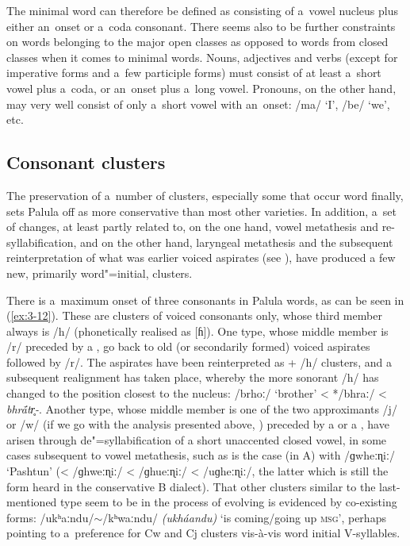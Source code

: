 The minimal word can therefore be defined as consisting of a~vowel nucleus plus either an~onset or a~coda consonant. There seems also to be further constraints on words belonging to the major open classes as opposed to words from closed classes when it comes to minimal words. Nouns, adjectives and verbs (except for imperative forms and a~few participle forms) must consist of at least a~short vowel plus a~coda, or an~onset plus a~long vowel. Pronouns, on the other hand, may very well consist of only a~short vowel with an~onset: /ma/ `I', /be/ `we', etc.


\subsection{Consonant clusters}
\label{subsec:3-3-2}


The preservation of a~number of clusters, especially some that occur word finally, sets Palula off as more conservative than most other \iliShina varieties. In addition, a~set of changes, at least partly related to, on the one hand, vowel metathesis and re-syllabification, and on the other hand, laryngeal metathesis and the subsequent reinterpretation of what was earlier voiced aspirates (see ), have produced a few new, primarily word"=initial, clusters.


There is a~maximum onset of three consonants in Palula words, as can be seen in (\ref{ex:3-12}). These are clusters of voiced consonants only, whose third member always is /h/ (phonetically realised as [ɦ]).  One type, whose middle member is /r/ preceded by a , go back to old (or secondarily formed) voiced aspirates followed by /r/. The aspirates have been reinterpreted as  + /h/ clusters, and a subsequent realignment has taken place, whereby the more sonorant /h/ has changed to the position closest to the  nucleus: /brhoː/ `brother' < */bhraː/ < \textit{bhr\'{\={a}}tr̥-}. Another type, whose middle member is one of the two approximants /j/ or /w/ (if we go with the analysis presented above, ) preceded by a  or a , have arisen through de"=syllabification of a short unaccented closed vowel, in some cases subsequent to vowel metathesis, such as is the case (in A) with /ɡwheːɳiː/ `Pashtun' (< /ɡhweːɳiː/ < /ɡhueːɳiː/ < /uɡheːɳiː/, the latter which is still the form heard in the conservative B dialect). That other clusters similar to the last-mentioned type seem to be in the process of evolving is evidenced by co-existing forms: /ukʰaːndu/$\sim$/kʰwaːndu/ \textit{(ukháandu)} `is coming/going up \textsc{msg}', perhaps pointing to a~preference for Cw and Cj clusters vis-à-vis word initial V-syllables. 



